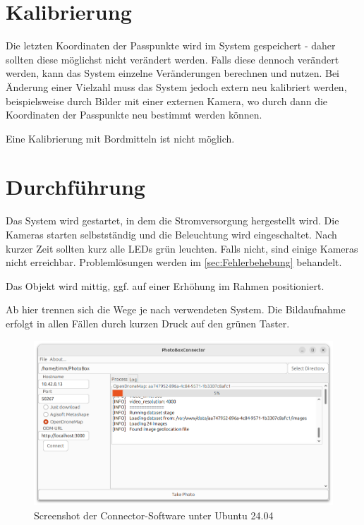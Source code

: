 \documentclass[./00PhotoBox.tex]{subfiles}
\begin{document}
\section{Kalibrierung}
Die letzten Koordinaten der Passpunkte wird im System gespeichert - daher sollten diese möglichst nicht verändert werden. Falls diese dennoch verändert werden, kann das System einzelne Veränderungen berechnen und nutzen. Bei Änderung einer Vielzahl muss das System jedoch extern neu kalibriert werden, beispielsweise durch Bilder mit einer externen Kamera, wo durch dann die Koordinaten der Passpunkte neu bestimmt werden können.

Eine Kalibrierung mit Bordmitteln ist nicht möglich.

\section{Durchführung}
Das System wird gestartet, in dem die Stromversorgung hergestellt wird. Die Kameras starten selbstständig und die Beleuchtung wird eingeschaltet. Nach kurzer Zeit sollten kurz alle LEDs grün leuchten. Falls nicht, sind einige Kameras nicht erreichbar. Problemlösungen werden im \autoref{sec:Fehlerbehebung} behandelt.

Das Objekt wird mittig, ggf. auf einer Erhöhung im Rahmen positioniert.

Ab hier trennen sich die Wege je nach verwendeten System. Die Bildaufnahme erfolgt in allen Fällen durch kurzen Druck auf den grünen Taster.

\begin{figure}
    \centering
    \includegraphics[width=1\textwidth]{./img/connector_screenshot.png}
    \caption{Screenshot der Connector-Software unter Ubuntu 24.04} %
    \label{img:connector} %
\end{figure}
\end{document}
